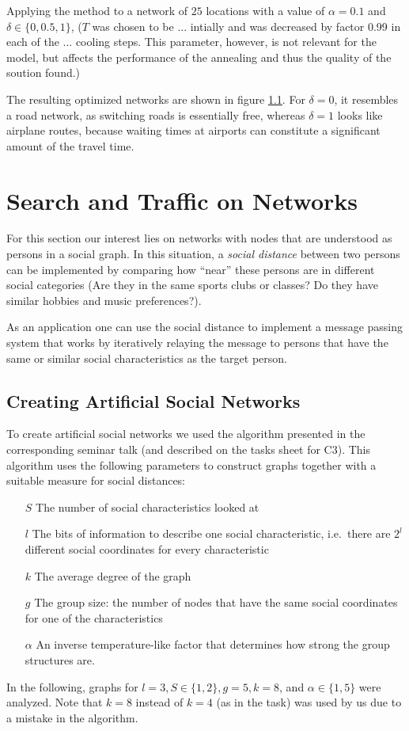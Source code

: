 \documentclass{scrartcl}
\begin{document}
Applying the method to a network of $25$ locations with a value of
$\alpha=0.1$ and $\delta \in \{0, 0.5, 1\}$, ($T$ was chosen to be ...
intially and was decreased by factor 0.99 in each of the ... cooling steps.
This parameter, however, is not relevant for the model, but affects the
performance of the annealing and thus the quality of the soution found.)

The resulting optimized networks are shown in figure \ref{}. For
$\delta=0$, it resembles a road network, as switching roads is essentially
free, whereas $\delta=1$ looks like airplane routes, because waiting times
at airports can constitute a significant amount of the travel time.



\clearpage 

\section{Search and Traffic on Networks}
For this section our interest lies on networks with nodes that are
understood as persons in a social graph. In this situation, a \emph{social
distance} between two persons can be implemented by comparing how
\enquote{near} these persons are in different social categories
(Are they in the same sports clubs or classes? Do they have similar hobbies
and music preferences?). 

As an application one can use the social distance
to implement a message passing system that works by iteratively relaying
the message to persons that have the same or similar social characteristics
as the target person.

\subsection{Creating Artificial Social Networks}
To create artificial social networks we used the algorithm presented
in the corresponding seminar talk (and described on the tasks sheet for
C3). This algorithm uses the following parameters to construct graphs
together with a suitable measure for social distances:
\begin{itemize}
    \item[$S$] The number of social characteristics looked at
    \item[$l$] The bits of information to describe one social
        characteristic, i.e.\ there are $2^l$ different social coordinates
        for every characteristic
    \item[$k$] The average degree of the graph
    \item[$g$] The group size: the number of nodes that have the same
        social coordinates for one of the characteristics
    \item[$\alpha$] An inverse temperature-like factor that determines how strong the
        group structures are.
\end{itemize}
In the following, graphs for $l = 3, S\in\{1, 2\}, g = 5, k = 8$, and
$\alpha\in\{1, 5\}$ were analyzed. Note that $k = 8$ instead of $k = 4$ (as
in the task) was used by us due to a mistake in the algorithm.
\end{document}
